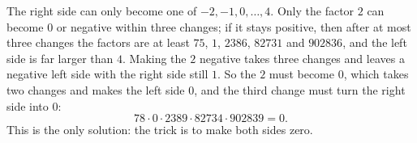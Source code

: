 The right side can only become one of $-2,-1,0,\dots,4$. Only the factor $2$ can become $0$ or negative within three changes; if it stays positive, then after at most three changes the factors are at least $75$, $1$, $2386$, $82731$ and $902836$, and the left side is far larger than $4$. Making the $2$ negative takes three changes and leaves a negative left side with the right side still $1$. So the $2$ must become $0$, which takes two changes and makes the left side $0$, and the third change must turn the right side into $0$:
\[\boxed{78\cdot0\cdot2389\cdot82734\cdot902839=0}.\]
This is the only solution: the trick is to make both sides zero.
